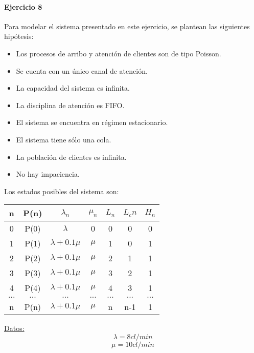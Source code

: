 \documentclass{article}
\begin{document}
\paragraph{Ejercicio 8}
   Para modelar el sistema presentado en este ejercicio, se plantean las siguientes hipótesis:

   \begin{itemize}
      \item Los procesos de arribo y atención de clientes son de tipo Poisson.
      \item Se cuenta con un único canal de atención.
      \item La capacidad del sistema es infinita.
      \item La disciplina de atención es FIFO.
      \item El sistema se encuentra en régimen estacionario.
      \item El sistema tiene sólo una cola.
      \item La población de clientes es infinita.
      \item No hay impaciencia.
   \end{itemize}

   Los estados posibles del sistema son:
   \begin{center}
   \begin{tabular}{|| c | c | c | c | c | c | c ||}
   \hline 
      n     & P(n) & $\lambda_n$         & $\mu_n$ & $L_n$& $L_cn$ & $H_n$ \\ \hline \hline
      0     & P(0) & $\lambda$           & 0       & 0    & 0      & 0     \\ \hline
      1     & P(1) & $\lambda + 0.1 \mu$ & $\mu$   & 1    & 0      & 1     \\ \hline
      2     & P(2) & $\lambda + 0.1 \mu$ & $\mu$   & 2    & 1      & 1     \\ \hline
      3     & P(3) & $\lambda + 0.1 \mu$ & $\mu$   & 3    & 2      & 1     \\ \hline
      4     & P(4) & $\lambda + 0.1 \mu$ & $\mu$   & 4    & 3      & 1     \\ \hline
      $...$ & $...$& $...$               & $...$   & $...$& $...$  & $...$ \\ \hline
      n     & P(n) & $\lambda + 0.1 \mu$ & $\mu$   & n    & n-1    & 1     \\ \hline
   \end{tabular}
   \end{center}

   \underline{Datos:} \\
   $$\lambda = 8 cl/min $$
   $$\mu = 10 cl/min $$
\end{document}
